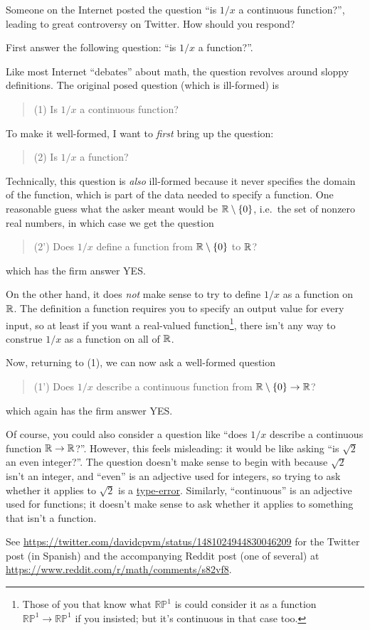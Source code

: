 \begin{problem}
	Someone on the Internet posted the question ``is $1/x$ a continuous function?'',
	leading to great controversy on Twitter. How should you respond?
	\begin{hint}
		First answer the following question: ``is $1/x$ a function?''.
	\end{hint}
	\begin{sol}
		Like most Internet ``debates'' about math,
		the question revolves around sloppy definitions.
		The original posed question (which is ill-formed) is
		\begin{quote}
			(1) Is $1/x$ a continuous function?
		\end{quote}
		To make it well-formed, I want to \emph{first} bring up the question:
		\begin{quote}
			(2) Is $1/x$ a function?
		\end{quote}
		Technically, this question is \emph{also} ill-formed because it never specifies
		the domain of the function, which is part of the data needed to specify a function.
		One reasonable guess what the asker meant would be $\mathbb R \setminus \{0\}$,
		i.e.\ the set of nonzero real numbers, in which case we get the question
		\begin{quote}
			(2') Does $1/x$ define a function from $\mathbb R \setminus \{0\}$ to $\mathbb R$?
		\end{quote}
		which has the firm answer YES.

		On the other hand, it does \emph{not} make sense to try to define $1/x$
		as a function on $\mathbb R$.
		The definition a function requires you to specify an output value for every input,
		so at least if you want a real-valued function\footnote{Those of you
			that know what $\mathbb{RP}^1$ is could consider it as a function
			$\mathbb{RP}^1 \to \mathbb{RP}^1$ if you insisted;
			but it's continuous in that case too.},
		there isn't any way to construe $1/x$ as a function on all of $\mathbb R$.

		Now, returning to (1), we can now ask a well-formed question
		\begin{quote}
			(1') Does $1/x$ describe a continuous function from $\mathbb R \setminus \{0\} \to \mathbb R$?
		\end{quote}
		which again has the firm answer YES.

		Of course, you could also consider a question like
		``does $1/x$ describe a continuous function $\mathbb R \to \mathbb R$?''.
		However, this feels misleading:
		it would be like asking ``is $\sqrt{2}$ an even integer?''.
		The question doesn't make sense to begin with because $\sqrt2$ isn't an integer,
		and ``even'' is an adjective used for integers,
		so trying to ask whether it applies to $\sqrt2$ is a \href{https://qchu.wordpress.com/2013/05/28/the-type-system-of-mathematics/}{type-error}.
		Similarly, ``continuous'' is an adjective used for functions;
		it doesn't make sense to ask whether it applies to something that isn't a function.

		See \url{https://twitter.com/davidcpvm/status/1481024944830046209}
		for the Twitter post (in Spanish) and the accompanying Reddit post (one of several)
		at \url{https://www.reddit.com/r/math/comments/s82vf8}.
	\end{sol}
\end{problem}
